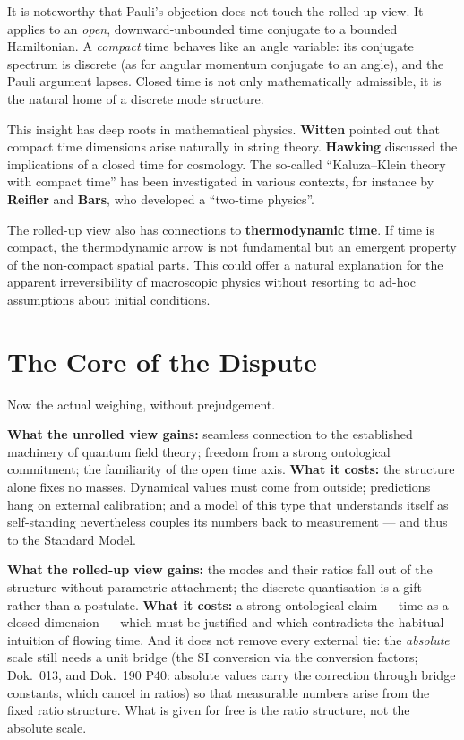 It is noteworthy that Pauli's objection does not touch the rolled-up view. It applies to an \emph{open}, downward-unbounded time conjugate to a bounded Hamiltonian. A \emph{compact} time behaves like an angle variable: its conjugate spectrum is discrete (as for angular momentum conjugate to an angle), and the Pauli argument lapses. Closed time is not only mathematically admissible, it is the natural home of a discrete mode structure.

This insight has deep roots in mathematical physics. \textbf{Witten} pointed out that compact time dimensions arise naturally in string theory. \textbf{Hawking} discussed the implications of a closed time for cosmology. The so-called ``Kaluza--Klein theory with compact time'' has been investigated in various contexts, for instance by \textbf{Reifler} and \textbf{Bars}, who developed a ``two-time physics''.

The rolled-up view also has connections to \textbf{thermodynamic time}. If time is compact, the thermodynamic arrow is not fundamental but an emergent property of the non-compact spatial parts. This could offer a natural explanation for the apparent irreversibility of macroscopic physics without resorting to ad-hoc assumptions about initial conditions.

\section{The Core of the Dispute}

Now the actual weighing, without prejudgement.

\textbf{What the unrolled view gains:} seamless connection to the established machinery of quantum field theory; freedom from a strong ontological commitment; the familiarity of the open time axis. \textbf{What it costs:} the structure alone fixes no masses. Dynamical values must come from outside; predictions hang on external calibration; and a model of this type that understands itself as self-standing nevertheless couples its numbers back to measurement --- and thus to the Standard Model.

\textbf{What the rolled-up view gains:} the modes and their ratios fall out of the structure without parametric attachment; the discrete quantisation is a gift rather than a postulate. \textbf{What it costs:} a strong ontological claim --- time as a closed dimension --- which must be justified and which contradicts the habitual intuition of flowing time. And it does not remove every external tie: the \emph{absolute} scale still needs a unit bridge (the SI conversion via the conversion factors; Dok.~013, and Dok.~190 P40: absolute values carry the correction through bridge constants, which cancel in ratios) so that measurable numbers arise from the fixed ratio structure. What is given for free is the ratio structure, not the absolute scale.

